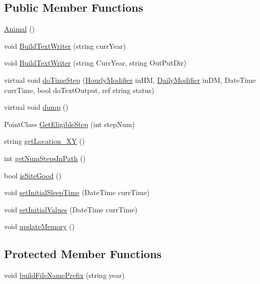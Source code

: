 \subsection*{Public Member Functions}
\begin{DoxyCompactItemize}
\item 
\hyperlink{class_s_e_a_r_c_h_1_1_animal_aaa9f5d5d51a341abf19884abd2c0ee4c}{Animal} ()
\item 
void \hyperlink{class_s_e_a_r_c_h_1_1_animal_a622cf18a10d3e62e83b7063b7baa4189}{Build\-Text\-Writer} (string curr\-Year)
\item 
void \hyperlink{class_s_e_a_r_c_h_1_1_animal_a025bfbfcb038a9cd111fddb3f44a1082}{Build\-Text\-Writer} (string Curr\-Year, string Out\-Put\-Dir)
\item 
virtual void \hyperlink{class_s_e_a_r_c_h_1_1_animal_ad805d6441c4c873121136b641c404f3a}{do\-Time\-Step} (\hyperlink{class_s_e_a_r_c_h_1_1_hourly_modifier}{Hourly\-Modifier} in\-H\-M, \hyperlink{class_s_e_a_r_c_h_1_1_daily_modifier}{Daily\-Modifier} in\-D\-M, Date\-Time curr\-Time, bool do\-Text\-Output, ref string status)
\item 
virtual void \hyperlink{class_s_e_a_r_c_h_1_1_animal_ade2aab75e98f185a6f9ab2a5a9244bd3}{dump} ()
\item 
Point\-Class \hyperlink{class_s_e_a_r_c_h_1_1_animal_a303c52aede292098a8845d20a6a22cbf}{Get\-Eligible\-Step} (int step\-Num)
\item 
string \hyperlink{class_s_e_a_r_c_h_1_1_animal_aebe57edbaed290aa5d8131f99e69a6df}{get\-Location\-\_\-\-X\-Y} ()
\item 
int \hyperlink{class_s_e_a_r_c_h_1_1_animal_a5a9c4cc24c0989dd3d018d0231d3b160}{get\-Num\-Steps\-In\-Path} ()
\item 
bool \hyperlink{class_s_e_a_r_c_h_1_1_animal_ac7c6949790bf0be128c97d33f6131113}{is\-Site\-Good} ()
\item 
void \hyperlink{class_s_e_a_r_c_h_1_1_animal_aa7b2bbfe6c492ee6ab035ecdb16f8ce8}{set\-Initial\-Sleep\-Time} (Date\-Time curr\-Time)
\item 
void \hyperlink{class_s_e_a_r_c_h_1_1_animal_ad20fe454decc426f90750b45c2f0d28d}{set\-Initial\-Values} (Date\-Time curr\-Time)
\item 
void \hyperlink{class_s_e_a_r_c_h_1_1_animal_a1baf56f0f37d4e69f3252d76bfd4e530}{update\-Memory} ()
\end{DoxyCompactItemize}
\subsection*{Protected Member Functions}
\begin{DoxyCompactItemize}
\item 
void \hyperlink{class_s_e_a_r_c_h_1_1_animal_a0e3ffaa97d8155513f5e617972e42ef3}{build\-File\-Name\-Prefix} (string year)
\end{DoxyCompactItemize}
